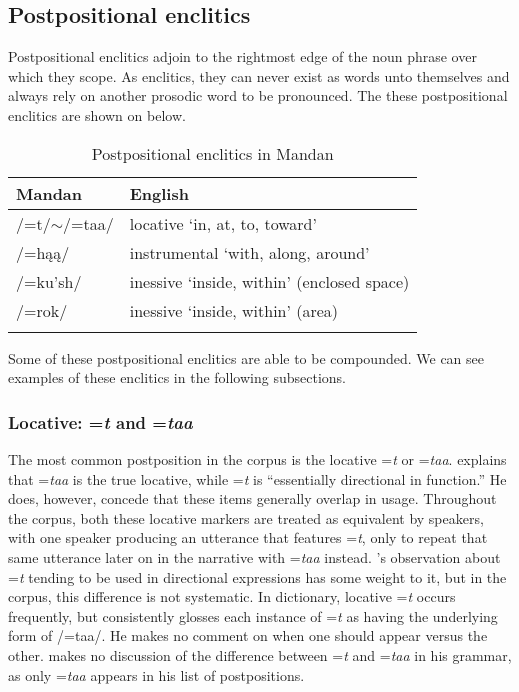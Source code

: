 \subsection{Postpositional enclitics}\label{SubSecPostpositionalEnclitics}

Postpositional enclitics adjoin to the rightmost edge of the noun phrase over which they scope. As enclitics, they can never exist as words unto themselves and always rely on another prosodic word to be pronounced. The these postpositional enclitics are shown on  below.

\begin{table}
        \caption{Postpositional enclitics in Mandan}\label{TablePostpositionalEnclitics}
    \begin{tabular}{ll}
\lsptoprule
    \textbf{Mandan}&\textbf{English}\\
\midrule
    /=t/$\sim$/=taa/& locative `in, at, to, toward'\\
    /=hąą/& instrumental `with, along, around'\\
    /=ku'sh/&  inessive `inside, within' (enclosed space)\\
    /=rok/&   inessive `inside, within' (area)  \\
    \lspbottomrule
    \end{tabular}
\end{table}

Some of these postpositional enclitics are able to be compounded. We can see examples of these enclitics in the following subsections.

\subsubsection{Locative: =\textit{t} and =\textit{taa}}

The most common postposition in the corpus is the locative =\textit{t} or =\textit{taa}. \citet[25]{kennard1936} explains that =\textit{taa} is the true locative, while =\textit{t} is ``essentially directional in function.'' He does, however, concede that these items generally overlap in usage. Throughout the corpus, both these locative markers are treated as equivalent by speakers, with one speaker producing an utterance that features =\textit{t}, only to repeat that same utterance later on in the narrative with =\textit{taa} instead. \citeauthor{kennard1936}'s observation about =\textit{t} tending to be used in directional expressions has some weight to it, but in the corpus, this difference is not systematic. In  dictionary, locative =\textit{t} occurs frequently, but \citeauthor{hollow1970} consistently glosses each instance of =\textit{t} as having the underlying form of /=taa/. He makes no comment on when one should appear versus the other. \citet[39]{mixco1997a} makes no discussion of the difference between =\textit{t} and =\textit{taa} in his grammar, as only =\textit{taa} appears in his list of postpositions.

